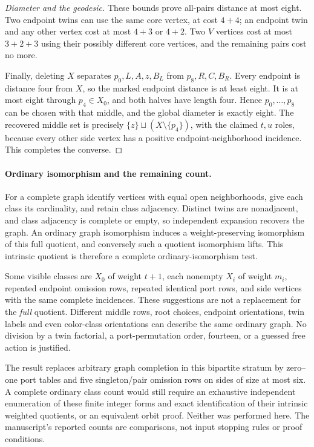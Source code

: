\documentclass[11pt]{article}
\begin{document}
\begin{proof}[Diameter and the geodesic]
These bounds prove all-pairs distance at most eight. Two endpoint
twins can use the same core vertex, at cost $4+4$; an endpoint
twin and any other vertex cost at most $4+3$ or $4+2$. Two
$V$ vertices cost at most $3+2+3$ using their possibly different
core vertices, and the remaining pairs cost no more.

Finally, deleting $X$ separates $p_0,L,A,z,B_L$ from $p_8,R,C,B_R$.
Every endpoint is distance four from $X$, so the marked endpoint
distance is at least eight. It is at most eight through $p_4\in X_0$,
and both halves have length four. Hence $p_0,\ldots,p_8$ can be
chosen with that middle, and the global diameter is exactly eight.
The recovered middle set is precisely $\{z\}\sqcup(X\setminus\{p_4\})$,
with the claimed $t,u$ roles, because every other side vertex has
a positive endpoint-neighborhood incidence. This completes the converse.
\end{proof}

\paragraph{Ordinary isomorphism and the remaining count.}
For a complete graph identify vertices with equal open neighborhoods,
give each class its cardinality, and retain class adjacency. Distinct
twins are nonadjacent, and class adjacency is complete or empty, so
independent expansion recovers the graph. An ordinary graph isomorphism
induces a weight-preserving isomorphism of this full quotient, and
conversely such a quotient isomorphism lifts. This intrinsic quotient
is therefore a complete ordinary-isomorphism test.

Some visible classes are $X_0$ of weight $t+1$, each nonempty $X_i$
of weight $m_i$, repeated endpoint omission rows, repeated identical
port rows, and side vertices with the same complete incidences.
These suggestions are not a replacement for the \emph{full} quotient.
Different middle rows, root choices, endpoint orientations, twin
labels and even color-class orientations can describe the same
ordinary graph. No division by a twin factorial, a port-permutation
order, fourteen, or a guessed free action is justified.

The result replaces arbitrary graph completion in this bipartite
stratum by zero--one port tables and five singleton/pair omission
rows on sides of size at most six. A complete ordinary class count
would still require an exhaustive independent enumeration of these
finite integer forms and exact identification of their intrinsic
weighted quotients, or an equivalent orbit proof. Neither was
performed here. The manuscript's reported counts are comparisons,
not input stopping rules or proof conditions.
\end{document}
